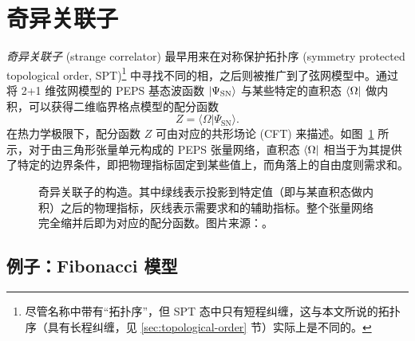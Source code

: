 \section{奇异关联子}
\label{sec:strange-correlator}

\emph{奇异关联子} (strange correlator) 最早用来在对称保护拓扑序 (symmetry protected topological order, SPT)\footnote{尽管名称中带有“拓扑序”，但 SPT 态中只有短程纠缠，这与本文所说的拓扑序（具有长程纠缠，见 \ref{sec:topological-order} 节）实际上是不同的。} 中寻找不同的相\cite{you2014wave}，之后则被推广到了弦网模型中\cite{vanhove2018mapping,lootens2019cardy,vanhove2022topological}。通过将 2+1 维弦网模型的 PEPS 基态波函数 $\ket{\Psi_\text{SN}}$ 与某些特定的直积态 $\bra{\Omega}$ 做内积，可以获得二维临界格点模型的配分函数
\begin{equation}
  Z = \langle\Omega|\Psi_\text{SN}\rangle.
\end{equation}
在热力学极限下，配分函数 $Z$ 可由对应的共形场论 (CFT) 来描述。如图~\ref{fig:peps-strange-correlator} 所示，对于由三角形张量单元构成的 PEPS 张量网络，直积态 $\bra{\Omega}$ 相当于为其提供了特定的边界条件，即把物理指标固定到某些值上，而角落上的自由度则需求和。

\begin{figure}[htb]
  \centering
  \caption[奇异关联子的构造]{奇异关联子的构造。其中绿线表示投影到特定值（即与某直积态做内积）之后的物理指标，灰线表示需要求和的辅助指标。整个张量网络完全缩并后即为对应的配分函数。图片来源：\parencite{zeng2023virasoro}。}
  \label{fig:peps-strange-correlator}
\end{figure}

\subsection{例子：Fibonacci 模型}
\label{subsec:strange-correlator-fib}

